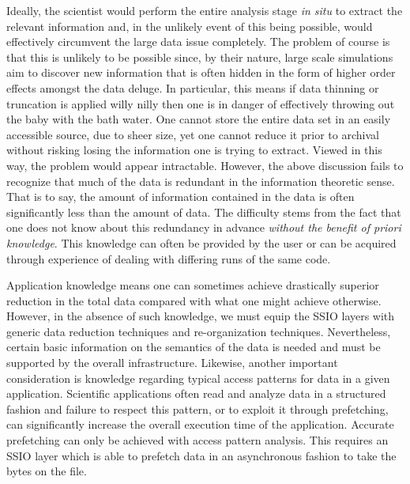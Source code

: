 Ideally, the scientist would perform the entire analysis stage {\em in situ} to
extract the relevant information and, in the unlikely event of this being
possible, would effectively circumvent the large data issue completely.  The
problem of course is that this is unlikely to be possible since, by their
nature, large scale simulations aim to discover new information that is often
hidden in the form of higher order effects amongst the data deluge. In
particular, this means if data thinning or truncation is applied willy nilly
then one is in danger of effectively throwing out the baby with the bath water.
One cannot store the entire data set in an easily accessible source, due to
sheer size, yet one cannot reduce it prior to archival without risking losing
the information one is trying to extract.  Viewed in this way, the problem
would appear intractable. However, the above discussion fails to recognize that
much of the data is redundant in the information theoretic sense.  That is to
say, the amount of information contained in the data is often significantly
less than the amount of data.  The difficulty stems from the fact that one does
not know about this redundancy in advance \emph{without the benefit of 
priori knowledge}. This knowledge can often be provided by the user or can 
be acquired through experience of dealing with differing runs of the same
code. 

Application knowledge means one can sometimes achieve drastically superior
reduction in the total data compared with what one might achieve otherwise.
However, in the absence of such knowledge, we must equip the SSIO layers with
generic data reduction techniques and re-organization techniques.
Nevertheless, certain basic information on the semantics of the data is needed
and must be supported by the overall infrastructure.  Likewise, another
important consideration is knowledge regarding typical access patterns for data
in a given application. Scientific applications often read and analyze data in
a structured fashion and failure to respect this pattern, or to exploit it
through prefetching, can significantly increase the overall execution time of
the application. Accurate prefetching can only be achieved with access pattern
analysis. This requires an SSIO layer which is able to prefetch data in an
asynchronous fashion to take the bytes on the file.

